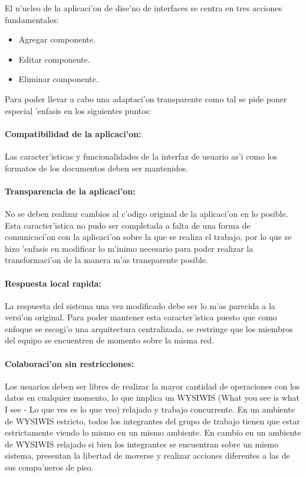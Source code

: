 \medskip

El n'ucleo de la aplicaci'on de dise'no de interfaces se centra en tres acciones fundamentales:

\begin{itemize}
\item Agregar componente.
\item Editar componente.
\item Eliminar componente.
\end{itemize}

\medskip
Para poder llevar a cabo una adaptaci'on transparente como tal se pide poner especial 'enfasis en los siguientes puntos:
\medskip
\paragraph{Compatibilidad de la aplicaci'on​:}
Las caracter'isticas y funcionalidades de la interfaz de usuario as'i como los formatos de los documentos deben ser mantenidos.

\paragraph{Transparencia de la aplicaci'on:}
​No se deben realizar cambios al c'odigo original de la aplicaci'on en lo posible. Esta caracter'istica no pudo ser completada a falta de una forma de comunicaci'on con la aplicaci'on sobre la que se realiza el trabajo, por lo que se hizo 'enfasis en modificar lo m'inimo necesario para poder realizar la transformaci'on de la manera m'as transparente posible.

\paragraph{Respuesta local rapida:}
​La respuesta del sistema una vez modificado debe ser lo m'as parecida a la versi'on original. Para poder mantener esta caracter'istica puesto que como enfoque se escogi'o una arquitectura centralizada, se restringe que los miembros del equipo se encuentren de momento sobre la misma red.

\paragraph{Colaboraci'on sin restricciones:}
Los usuarios deben ser libres de realizar la mayor cantidad de operaciones con los datos en cualquier momento, lo que implica un
WYSIWIS (What you see is what I see - Lo que ves es lo que veo) relajado y trabajo concurrente. En un ambiente de WYSIWIS estricto, todos los integrantes del grupo de trabajo tienen que estar
estrictamente viendo lo mismo en un mismo ambiente. En cambio en un ambiente de WYSIWIS relajado si bien los integrantes se encuentran sobre un mismo sistema, presentan la libertad de moverse y realizar acciones diferentes a las de sus compa'neros de piso.

